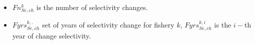 \documentclass{article}
\begin{document}
\begin{itemize}
    \item $Fn_{Se,ch}^k$ is the number of selectivity changes.
    \item $Fyrs_{Se,ch}^{k,.}$ set of years of selectivity change for fishery $k$, $Fyrs_{Se,ch}^{k,i}$ is the $i-$th year of change selectivity.
    

\end{itemize}
\end{document}
